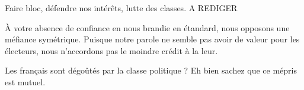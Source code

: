 \documentclass[french,12pt,amstex,a4paper]{article}
\begin{document}
Faire bloc, défendre nos intérêts, lutte des classes. A REDIGER

À votre absence de confiance en nous brandie en étandard, nous opposons une méfiance symétrique. Puisque notre parole ne semble pas avoir de valeur pour les électeurs, nous n'accordons pas le moindre crédit à la leur.

Les français sont dégoûtés par la classe politique ? Eh bien sachez que ce mépris est mutuel.
\end{document}
